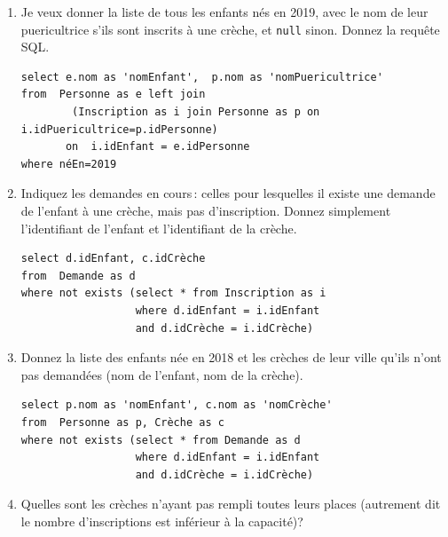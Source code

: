 \begin{enumerate}
 \item Je veux donner la liste de tous les enfants nés en 2019, avec le nom
     de leur puericultrice s'ils sont inscrits à une crèche, et \texttt{null}
     sinon. Donnez la requête SQL.
     
\begin{solution}
 \begin{small}
\begin{verbatim}
select e.nom as 'nomEnfant',  p.nom as 'nomPuericultrice'
from  Personne as e left join 
        (Inscription as i join Personne as p on i.idPuericultrice=p.idPersonne)
       on  i.idEnfant = e.idPersonne
where néEn=2019
\end{verbatim}
\end{small}
\end{solution}
 
  \item Indiquez les demandes en cours\,: celles pour lesquelles il existe une 
  demande de l'enfant à une crèche, mais pas d'inscription. Donnez simplement
  l'identifiant de l'enfant et l'identifiant de la crèche.
 
\begin{solution}
 \begin{small}
\begin{verbatim}
select d.idEnfant, c.idCrèche
from  Demande as d
where not exists (select * from Inscription as i
                  where d.idEnfant = i.idEnfant
                  and d.idCrèche = i.idCrèche)
\end{verbatim}
\end{small}
\end{solution}
 
  \item Donnez la liste des enfants née en 2018 et les crèches de leur ville
     qu'ils n'ont pas demandées (nom de l'enfant, nom de la crèche).

\begin{solution}
\begin{small}
\begin{verbatim}
select p.nom as 'nomEnfant', c.nom as 'nomCrèche'
from  Personne as p, Crèche as c
where not exists (select * from Demande as d
                  where d.idEnfant = i.idEnfant
                  and d.idCrèche = i.idCrèche)
\end{verbatim}
\end{small}
\end{solution}
 
  \item Quelles sont les crèches n'ayant pas rempli toutes leurs places
  (autrement dit  le nombre d'inscriptions est inférieur à la capacité)?


\end{enumerate}
